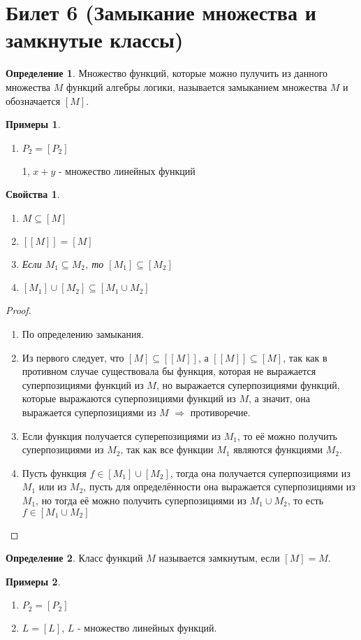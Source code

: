 \documentclass[a4paper, 12pt]{article}
\theoremstyle{definition}
\newtheorem*{definition}{Определение}
\newtheorem*{example}{Примеры}
\theoremstyle{plain}
\newtheorem*{properties}{Свойства}
\theoremstyle{remark}
\begin{document}
  \section{Билет 6 (Замыкание множества и замкнутые классы)}
  \begin{definition}
    Множество функций, которые можно пулучить из данного множества $M$ функций алгебры логики, называется замыканием множества $M$ и обозначается $[M]$.
  \end{definition}
  \begin{example}
    \begin{enumerate}
      \item $P_2=[P_2]$
      \item [{1, $x+y$}] - множество линейных функций
    \end{enumerate}
  \end{example}
  \begin{properties}
    \begin{enumerate}
      \item $M\subseteq[M]$
      \item $[[M]]=[M]$
      \item Если $M_1\subseteq M_2$, то $[M_1]\subseteq[M_2]$
      \item $[M_1]\cup[M_2]\subseteq[M_1\cup M_2]$
    \end{enumerate}
  \end{properties}
  \begin{proof}
    \begin{enumerate}
      \item По определению замыкания.
      \item Из первого следует, что $[M]\subseteq[[M]]$, а $[[M]]\subseteq[M]$, так как в противном случае существовала бы функция, которая не выражается суперпозициями функций из $M$, но выражается суперпозициями функций, которые выражаются суперпозициями функций из $M$, а значит, она выражается суперпозициями из $M$ $\Longrightarrow$ противоречие.
      \item Если функция получается суперепозициями из $M_1$, то её можно получить суперпозициями из $M_2$, так как все функции $M_1$ являются функциями $M_2$.
      \item Пусть функция $f\in[M_1]\cup[M_2]$, тогда она получается суперпозициями из $M_1$ или из $M_2$, пусть для определённости она выражается суперпозициями из $M_1$, но тогда её можно получить суперпозициями из $M_1\cup M_2$, то есть $f\in[M_1\cup M_2]$
    \end{enumerate}
  \end{proof}
  \begin{definition}
    Класс функций $M$ называется замкнутым, если $[M]=M$.
  \end{definition}
  \begin{example}
    \begin{enumerate}
      \item $P_2=[P_2]$
      \item $L=[L]$, $L$ - множество линейных функций.
    \end{enumerate}
  \end{example}
\end{document}

